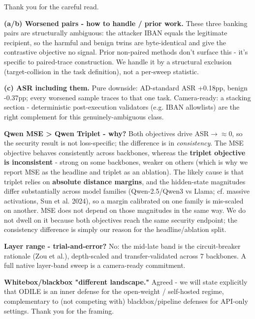 \documentclass[11pt]{article}
\begin{document}
\vspace{4pt}\par

Thank you for the careful read.\par

\textbf{(a/b) Worsened pairs - how to handle / prior work.} These three banking pairs are structurally ambiguous: the attacker IBAN equals the legitimate recipient, so the harmful and benign twins are byte-identical and give the contrastive objective no signal. Prior non-paired methods don't surface this - it's specific to paired-trace construction. We handle it by a structural exclusion (target-collision in the task definition), not a per-sweep statistic.\par
\textbf{(c) ASR including them.} Pure downside: AD-standard ASR +0.18pp, benign -0.37pp; every worsened sample traces to that one task. Camera-ready: a stacking section - deterministic post-execution validators (e.g. IBAN allowlists) are the right complement for this genuinely-ambiguous class.\par

\textbf{Qwen MSE \textgreater{} Qwen Triplet - why?} Both objectives drive ASR$\rightarrow$$\approx$0, so the security result is not loss-specific; the difference is in \emph{consistency}. The MSE objective behaves consistently across backbones, whereas the \textbf{triplet objective is inconsistent} - strong on some backbones, weaker on others (which is why we report MSE as the headline and triplet as an ablation). The likely cause is that triplet relies on \textbf{absolute distance margins}, and the hidden-state magnitudes differ substantially across model families (Qwen-2.5/Qwen3 vs Llama; cf. massive activations, Sun et al. 2024), so a margin calibrated on one family is mis-scaled on another. MSE does not depend on those magnitudes in the same way. We do not dwell on it because both objectives reach the same security endpoint; the consistency difference is simply our reason for the headline/ablation split.\par

\textbf{Layer range - trial-and-error?} No: the mid-late band is the circuit-breaker rationale (Zou et al.), depth-scaled and transfer-validated across 7 backbones. A full native layer-band sweep is a camera-ready commitment.\par

\textbf{Whitebox/blackbox "different landscape."} Agreed - we will state explicitly that ODILE is an inner defense for the open-weight / self-hosted regime, complementary to (not competing with) blackbox/pipeline defenses for API-only settings. Thank you for the framing.\par
\end{document}
